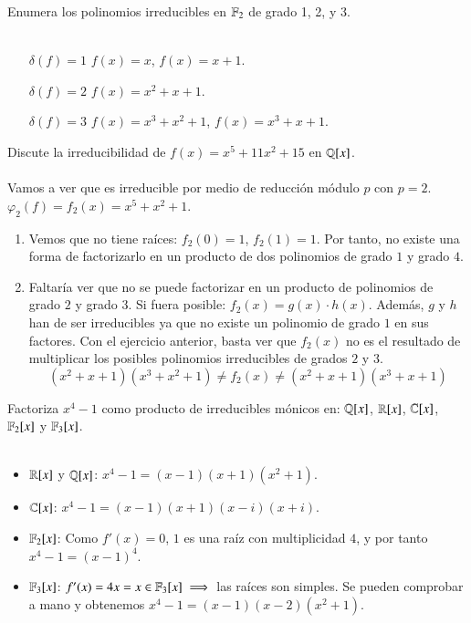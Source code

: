 \begin{ex}[H1.30 (parte)]
    Enumera los polinomios irreducibles en $\mathbb{F}_2$ de grado 1, 2, y 3.\\\\
    \begin{itemize}
        \item[$\delta(f) = 1$] $f(x) = x$, $f(x) = x + 1$.
        \item[$\delta(f) = 2$] $f(x) = x^2 + x + 1$.
        \item[$\delta(f) = 3$] $f(x) = x^3 + x^2 + 1$, $f(x) = x^3 + x + 1$.
    \end{itemize}
\end{ex}


\begin{ex}[H1.35]
    Discute la irreducibilidad de $f(x) = x^5 + 11 x^2 + 15$ en $\mathbb{Q}[x]$.\\\\

    Vamos a ver que es irreducible por medio de reducción módulo $p$ con $p = 2$. $\varphi_2(f) = f_2(x) = x^5 + x^2 + 1$.
    \begin{enumerate}
        \item Vemos que no tiene raíces: $f_2(0) = 1$, $f_2(1) = 1$. Por tanto, no existe una forma de factorizarlo en un producto de dos polinomios de grado $1$ y grado $4$.
        \item Faltaría ver que no se puede factorizar en un producto de polinomios de grado $2$ y grado $3$. Si fuera posible:
        $f_2(x) = g(x) \cdot h(x)$. Además, $g$ y $h$ han de ser irreducibles ya que no existe un polinomio de grado $1$ en sus factores. Con el ejercicio anterior, basta ver que $f_2(x)$ no es el resultado de multiplicar los posibles polinomios irreducibles de grados $2$ y $3$.
        $$
            (x^2 + x + 1)(x^3 + x^2 + 1) \neq f_2(x) \neq (x^2 + x + 1)(x^3 + x + 1)
        $$
    \end{enumerate}
\end{ex}

\begin{ex}[H1.39]
    Factoriza $x^4 -1$ como producto de irreducibles mónicos en: $\mathbb{Q}[x]$, $\mathbb{R}[x]$, $\mathbb{C}[x]$, $\mathbb{F}_2[x]$ y $\mathbb{F}_3[x]$.\\\\
    \begin{itemize}
        \item $\mathbb{R}[x]$ y $\mathbb{Q}[x]$: $x^4 - 1 = (x - 1)(x + 1)(x^2 + 1)$.
        \item $\mathbb{C}[x]$: $x^4 - 1 = (x - 1)(x + 1)(x - i)(x + i)$.
        \item $\mathbb{F}_2[x]$: Como $f'(x) = 0$, $1$ es una raíz con multiplicidad $4$, y por tanto $x^4 - 1 = (x-1)^4$.
        \item $\mathbb{F}_3[x]$: $f'(x) = 4x = x \in \mathbb{F}_3[x] \implies $ las raíces son simples. Se pueden comprobar a mano y obtenemos $x^4 - 1 = (x-1)(x-2)(x^2+1)$.
    \end{itemize}
\end{ex}


